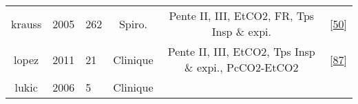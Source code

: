 \documentclass[12pt,]{article}
\begin{document}
\begin{landscape}
\begin{longtable}[]{@{}cllccl@{}}
\begin{minipage}[t]{0.09\columnwidth}
krauss\strut
\end{minipage} & \begin{minipage}[t]{0.05\columnwidth}\raggedright
2005\strut
\end{minipage} & \begin{minipage}[t]{0.08\columnwidth}\raggedright
262\strut
\end{minipage} & \begin{minipage}[t]{0.14\columnwidth}\centering
Spiro.\strut
\end{minipage} & \begin{minipage}[t]{0.40\columnwidth}\centering
Pente II, III, EtCO2, FR, Tps Insp \& expi.\strut
\end{minipage} & \begin{minipage}[t]{0.08\columnwidth}\raggedright
{[}\protect\hyperlink{ref-krauss2005capnogram}{50}{]}\strut
\end{minipage}\tabularnewline
\begin{minipage}[t]{0.09\columnwidth}\centering
lopez\strut
\end{minipage} & \begin{minipage}[t]{0.05\columnwidth}\raggedright
2011\strut
\end{minipage} & \begin{minipage}[t]{0.08\columnwidth}\raggedright
21\strut
\end{minipage} & \begin{minipage}[t]{0.14\columnwidth}\centering
Clinique\strut
\end{minipage} & \begin{minipage}[t]{0.40\columnwidth}\centering
Pente II, III, EtCO2, Tps Insp \& expi., PcCO2-EtCO2\strut
\end{minipage} & \begin{minipage}[t]{0.08\columnwidth}\raggedright
{[}\protect\hyperlink{ref-lopez2011capnography}{87}{]}\strut
\end{minipage}\tabularnewline
\begin{minipage}[t]{0.09\columnwidth}\centering
lukic\strut
\end{minipage} & \begin{minipage}[t]{0.05\columnwidth}\raggedright
2006\strut
\end{minipage} & \begin{minipage}[t]{0.08\columnwidth}\raggedright
5\strut
\end{minipage} & \begin{minipage}[t]{0.14\columnwidth}\centering
Clinique\strut
\end{minipage} & \begin{minipage}[t]{0.40\columnwidth}\centering

\end{minipage}
\end{longtable}
\end{landscape}
\end{document}
